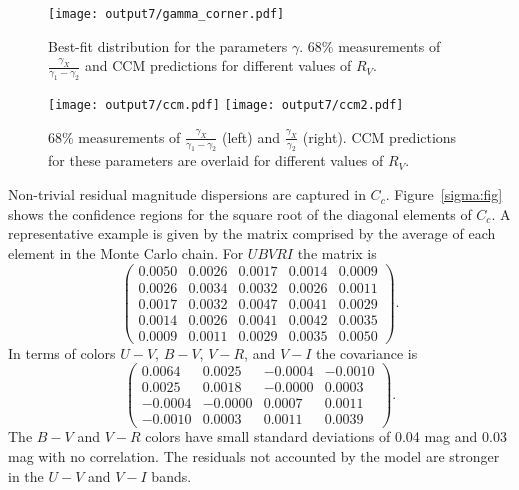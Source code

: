 \documentclass[11pt, oneside]{article}   	%
\begin{document}
\begin{figure}[htbp] %
   \centering
   \texttt{[image: output7/gamma\_corner.pdf]} 
   \caption{Best-fit distribution for the parameters $\gamma$.  68\% measurements of $\frac{\gamma_X}{\gamma_1-\gamma_2}$ and CCM
   predictions for different values of $R_V$.}
   \label{gamma:fig}
\end{figure}

\begin{figure}[htbp] %
   \centering
   \texttt{[image: output7/ccm.pdf]}
      \texttt{[image: output7/ccm2.pdf]} 
   \caption{68\% measurements of $\frac{\gamma_X}{\gamma_1-\gamma_2}$ (left) and $\frac{\gamma_X}{\gamma_2}$ (right).  CCM
   predictions for these parameters are overlaid for different values of $R_V$.}
   \label{ccm:fig}
\end{figure}

Non-trivial residual magnitude dispersions are captured in $C_c$.   Figure~\ref{sigma:fig} shows the confidence regions for the
square root of the diagonal elements of $C_c$.
A representative example is given by the matrix comprised by the average of each element in the Monte Carlo chain.
For $UBVRI$ the matrix is
\begin{equation}
\begin{pmatrix}
0.0050 & 0.0026 & 0.0017 & 0.0014 & 0.0009 \\
0.0026 & 0.0034 & 0.0032 & 0.0026 & 0.0011 \\
0.0017 & 0.0032 & 0.0047 & 0.0041 & 0.0029 \\
0.0014 & 0.0026 & 0.0041 & 0.0042 & 0.0035 \\
0.0009 & 0.0011 & 0.0029 & 0.0035 & 0.0050
 \end{pmatrix}.
 \end{equation}
 In terms of colors $U-V$, $B-V$, $V-R$, and $V-I$ the covariance is
\begin{equation}
\begin{pmatrix}
0.0064 & 0.0025 & -0.0004 & -0.0010 \\
0.0025 & 0.0018 & -0.0000 & 0.0003 \\
-0.0004 & -0.0000 & 0.0007 & 0.0011 \\
-0.0010 & 0.0003 & 0.0011 & 0.0039
  \end{pmatrix}.
 \end{equation}
 The $B-V$ and $V-R$ colors have small standard deviations of  0.04 mag and 0.03 mag with no correlation.  The
 residuals not accounted by the
 model are stronger in the $U-V$ and $V-I$ bands.
 
\end{document}
